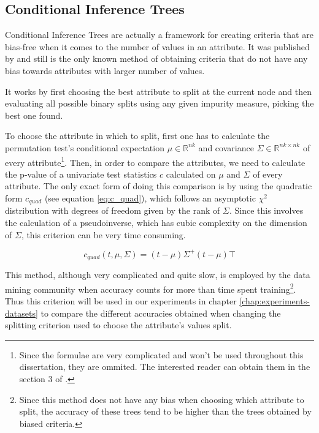\subsection{Conditional Inference Trees}
Conditional Inference Trees are actually a framework for creating criteria that are bias-free when it comes to the number of values in an attribute. It was published by \cite{Hothorn:2006:URP} and still is the only known method of obtaining criteria that do not have any bias towards attributes with larger number of values.

It works by first choosing the best attribute to split at the current node and then evaluating all possible binary splits using any given impurity measure, picking the best one found.

To choose the attribute in which to split, first one has to calculate the permutation test's conditional expectation $\mu \in \mathbb{R}^{nk}$ and covariance $\Sigma \in \mathbb{R}^{nk\times nk}$ of every attribute\footnote{Since the formulae are very complicated and won't be used throughout this dissertation, they are ommited. The interested reader can obtain them in the section 3 of  \cite{Hothorn:2006:URP}.}. Then, in order to compare the attributes, we need to calculate the p-value of a univariate test statistics $c$ calculated on $\mu$ and $\Sigma$ of every attribute. The only exact form of doing this comparison is by using the quadratic form $c_{quad}$ (see equation \ref{eq:c_quad}), which follows an asymptotic $\chi^2$ distribution with degrees of freedom given by the rank of $\Sigma$. Since this involves the calculation of a pseudoinverse, which has cubic complexity on the dimension of $\Sigma$, this criterion can be very time consuming.

\begin{equation}
\label{eq:c_quad}
c_{quad}(t, \mu, \Sigma) = (t-\mu)\Sigma^+(t-\mu)\top
\end{equation}

This method, although very complicated and quite slow, is employed by the data mining community when accuracy counts for more than time spent training\footnote{Since this method does not have any bias when choosing which attribute to split, the accuracy of these trees tend to be higher than the trees obtained by biased criteria.}. Thus this criterion will be used in our experiments in chapter \ref{chap:experiments-datasets} to compare the different accuracies obtained when changing the splitting criterion used to choose the attribute's values split.

